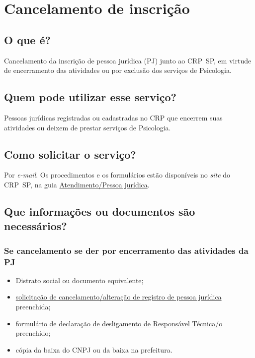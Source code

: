\chapter{Cancelamento de inscrição}
\label{chap:pj-cancelamento}

\section{O que é?}

Cancelamento da inscrição de pessoa jurídica (PJ) junto ao CRP~SP, em virtude de encerramento das atividades ou por exclusão dos serviços de Psicologia.

\section{Quem pode utilizar esse serviço?}

Pessoas jurídicas registradas ou cadastradas no CRP que encerrem suas atividades ou deixem de prestar serviços de Psicologia.

\section{Como solicitar o serviço?}

Por \emph{e-mail}. Os procedimentos e os formulários estão disponíveis no \emph{site} do CRP~SP, na guia \href{https://www.crpsp.org/pagina/view/30}{Atendimento/Pessoa jurídica}.

\section{Que informações ou documentos são necessários?}

\subsection{Se cancelamento se der por encerramento das atividades da PJ}

\begin{itemize}
  \item  Distrato social ou documento equivalente;
  \item  \hyperref[]{solicitação  de cancelamento/alteração de registro de pessoa jurídica} preenchida;
  \item  \hyperref[]{formulário  de declaração de desligamento de Responsável Técnica/o} preenchido;
  \item  cópia da baixa do CNPJ ou da baixa na prefeitura.
\end{itemize}

